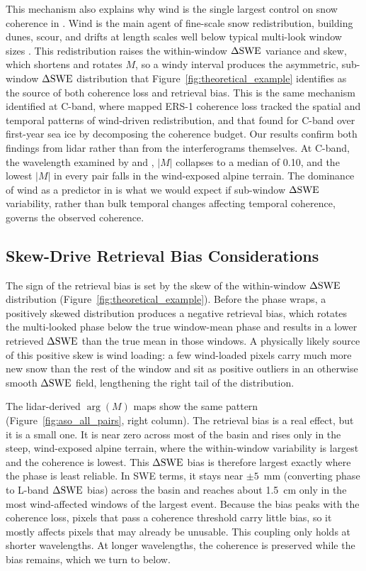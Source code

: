 \documentclass[journal abbreviation, manuscript]{copernicus}
\begin{document}
This mechanism also explains why wind is the single largest control on snow coherence in \citet{Ruiz2022}. Wind is the main agent of fine-scale snow redistribution, building dunes, scour, and drifts at length scales well below typical multi-look window sizes \citep{trujillo2007topographic-0ec}. This redistribution raises the within-window $\Delta\mathrm{SWE}$ variance and skew, which shortens and rotates $M$, so a windy interval produces the asymmetric, sub-window $\Delta\mathrm{SWE}$ distribution that Figure~\ref{fig:theoretical_example} identifies as the source of both coherence loss and retrieval bias. This is the same mechanism \citet{LiSturm2002} identified at C-band, where mapped ERS-1 coherence loss tracked the spatial and temporal patterns of wind-driven redistribution, and that \citet{ming2026} found for C-band over first-year sea ice by decomposing the coherence budget. Our results confirm both findings from lidar rather than from the interferograms themselves. At C-band, the wavelength examined by \citet{LiSturm2002} and \citet{ming2026}, $|M|$ collapses to a median of 0.10, and the lowest $|M|$ in every pair falls in the wind-exposed alpine terrain. The dominance of wind as a predictor in \citet{Ruiz2022} is what we would expect if sub-window $\Delta\mathrm{SWE}$ variability, rather than bulk temporal changes affecting temporal coherence, governs the observed coherence.

\subsection{Skew-Drive Retrieval Bias Considerations}\label{subsec:phase-bias}

The sign of the retrieval bias is set by the skew of the within-window $\Delta\mathrm{SWE}$ distribution (Figure~\ref{fig:theoretical_example}). Before the phase wraps, a positively skewed distribution produces a negative retrieval bias, which rotates the multi-looked phase below the true window-mean phase and results in a lower retrieved  $\Delta\mathrm{SWE}$ than the true mean in those windows. A physically likely source of this positive skew is wind loading: a few wind-loaded pixels carry much more new snow than the rest of the window and sit as positive outliers in an otherwise smooth $\Delta\mathrm{SWE}$ field, lengthening the right tail of the distribution.

The lidar-derived $\arg(M)$ maps show the same pattern (Figure~\ref{fig:aso_all_pairs}, right column). The retrieval bias is a real effect, but it is a small one. It is near zero across most of the basin and rises only in the steep, wind-exposed alpine terrain, where the within-window variability is largest and the coherence is lowest. This $\Delta\mathrm{SWE}$ bias is therefore largest exactly where the phase is least reliable. In SWE terms, it stays near $\pm5$~mm (converting phase to L-band $\Delta\mathrm{SWE}$ bias) across the basin and reaches about 1.5~cm only in the most wind-affected windows of the largest event. Because the bias peaks with the coherence loss, pixels that pass a coherence threshold carry little bias, so it mostly affects pixels that may already be unusable. This coupling only holds at shorter wavelengths. At longer wavelengths, the coherence is preserved while the bias remains, which we turn to below.
\end{document}
